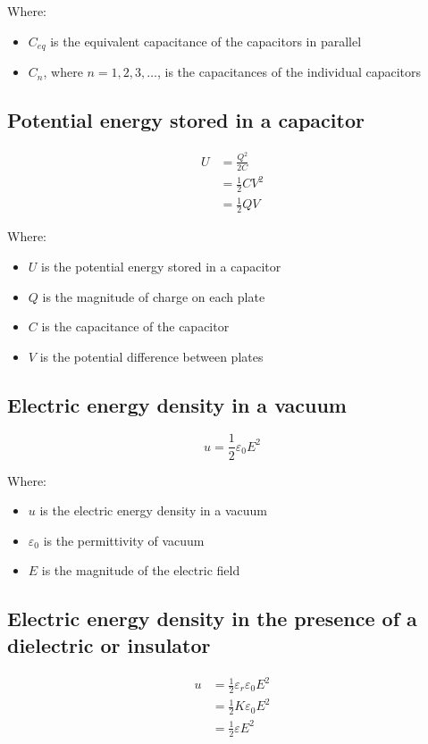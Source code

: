 \documentclass[11pt]{article}
\begin{document}
Where:
\begin{itemize}
\item \(C_{eq}\) is the equivalent capacitance of the capacitors in parallel
\item \(C_n\), where \(n = 1, 2, 3, \ldots\), is the capacitances of the individual capacitors
\end{itemize}

\subsection{Potential energy stored in a capacitor}
\label{sec:orgb2bdbdc}
\begin{align*}
U &= \frac{Q^2}{2C} \\
&= \frac{1}{2} CV^2 \\
&= \frac{1}{2} QV
\end{align*}

Where:
\begin{itemize}
\item \(U\) is the potential energy stored in a capacitor
\item \(Q\) is the magnitude of charge on each plate
\item \(C\) is the capacitance of the capacitor
\item \(V\) is the potential difference between plates
\end{itemize}

\subsection{Electric energy density in a vacuum}
\label{sec:org77eb22d}
\[u = \frac{1}{2} \varepsilon_0 E^2\]

Where:
\begin{itemize}
\item \(u\) is the electric energy density in a vacuum
\item \(\varepsilon_0\) is the permittivity of vacuum
\item \(E\) is the magnitude of the electric field
\end{itemize}

\subsection{Electric energy density in the presence of a dielectric or insulator}
\label{sec:org2203d05}
\begin{align*}
u &= \frac{1}{2} \varepsilon_r \varepsilon_0 E^2 \\
&= \frac{1}{2} K \varepsilon_0 E^2 \\
&= \frac{1}{2} \varepsilon E^2
\end{align*}
\end{document}
